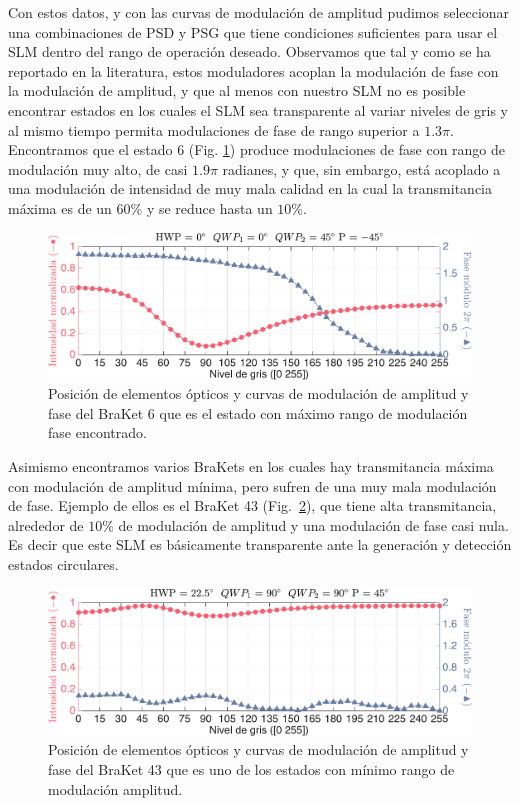 Con estos datos, y con las curvas de modulación de amplitud pudimos
seleccionar una combinaciones de PSD y PSG que tiene condiciones
suficientes para usar el SLM dentro del rango de operación
deseado. Observamos que tal y como se ha reportado en la literatura,
estos moduladores acoplan la modulación de fase con la modulación de
amplitud, y que al menos con nuestro SLM no es posible encontrar
estados en los cuales el SLM sea transparente al variar niveles de gris y al mismo
tiempo permita modulaciones de fase de rango superior a $1.3\pi$.  
Encontramos que el estado 6 (Fig. \ref{fig:amp_and_phase_I6}) produce
modulaciones de fase con rango de modulación muy alto, de casi $1.9\pi$
radianes, y que, sin embargo, está acoplado a una modulación de
intensidad de muy mala calidad en la cual la transmitancia máxima es de
un $60\%$ y se reduce hasta un $10\%$. 
\begin{figure}[H]
\centering
\includegraphics[scale=0.52]{amp_and_phase_I6.pdf}
\caption[Modulación de amplitud y fase del estado con máximo rango de
fase]{Posición de elementos ópticos y curvas de modulación de amplitud
  y fase del BraKet 6 que es el estado con máximo rango de modulación
  fase encontrado.} 
\label{fig:amp_and_phase_I6}
\end{figure}
Asimismo encontramos varios BraKets en los cuales hay transmitancia
máxima con modulación de amplitud mínima, pero sufren de una muy mala
modulación de fase. Ejemplo de ellos es el BraKet 43
(Fig.~\ref{fig:amp_and_phase_I43}), que tiene alta 
transmitancia, alrededor de $10\%$ de modulación de amplitud y una
 modulación de fase casi nula. Es decir que este SLM es básicamente
 transparente ante la generación y detección estados circulares.
\begin{figure}[H]
\centering
\includegraphics[scale=0.52]{amp_and_phase_I43.pdf}
\caption[Modulación de amplitud y fase del estado con mínima
modulación de amplitud]{Posición de elementos ópticos y curvas de modulación de amplitud
  y fase del BraKet 43 que es uno de los estados con mínimo rango de modulación
  amplitud.} 
\label{fig:amp_and_phase_I43}
\end{figure}


